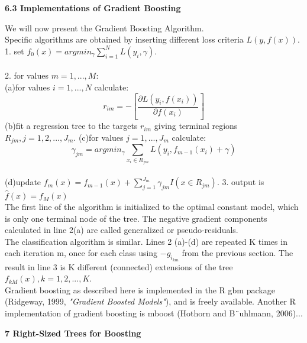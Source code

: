 \documentclass[12pt, letterpaper, twoside]{article}
\begin{document}
\begin{center}
\textbf{\large{6.3 Implementations of Gradient Boosting}}
\end{center}

\hspace*{4ex} We will now present the Gradient Boosting Algorithm.\\
Specific algorithms are obtained by inserting different loss criteria $L(y,f(x))$.
1. set $f_0(x)=argmin_{\gamma} \sum_{i=1}^N L(y_i,\gamma)$.\\\\
2. for values $m=1,...,M$:\\
\hspace*{4ex}(a)\space for values $i=1,...,N$ calculate:
\begin{equation*}
r_{im}=-[\frac{\partial L(y_i,f(x_i))}{\partial f(x_i)}]
\end{equation*}
\hspace*{4ex}(b)\space fit a regression tree to the targets $r_{im}$ giving terminal regions $R_{jm},j=1,2,...,J_m$.
\hspace*{4ex}(c)\space for values $j=1,...,J_m$ calculate:
\begin{equation*}
\gamma_{jm}=argmin_{\gamma}\sum_{x_i \in R_{jm}}L(y_i,f_{m-1}(x_i)+\gamma)
\end{equation*}\\
\hspace*{4ex}(d)\space update $f_m(x)=f_{m-1}(x)+\sum_{j=1}^{J_m} \gamma_{jm}I(x \in R_{jm})$.
3. output is $\hat{f}(x)=f_M(x)$\\
The first line of the algorithm is initialized to the optimal constant model, which is only one terminal node of the tree. The negative gradient components calculated in line 2(a) are called generalized or pseudo-residuals.\\
\hspace*{4ex}The classification algorithm is similar. Lines 2 (a)-(d) are repeated K times in each iteration m, once for each class using $−g_{i_{km}}$ from the previous section. The result in line 3 is K different (connected) extensions of the tree $f_{kM}(x),k=1,2,...,K$.\\
\hspace*{4ex}Gradient boosting as described here is implemented in the R gbm package (Ridgeway, 1999, \emph{"Gradient Boosted Models"}), and is freely available. Another R implementation of gradient boosting is mboost (Hothorn and B¨uhlmann, 2006)...
\begin{center}
\textbf{\large{7 Right-Sized Trees for Boosting}\\}
\end{center}
\end{document}
